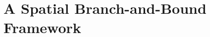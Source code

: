 \documentclass[12pt]{article}
\newcommand{\defeq}{\coloneq}
\newcommand{\conv}{\operatornamewithlimits{conv}}
\newcommand{\mcC}{\mathcal{C}}
\newcommand{\mcV}{\mathcal{V}}
\theoremstyle{remark}
\newtheorem{remark}{Remark}%
\begin{document}


\section{A Spatial Branch-and-Bound Framework}\label{sec:bnb}
\end{document}

